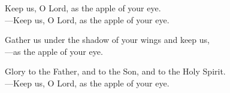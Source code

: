 \responsory

\noindent Keep us, O Lord, as the apple of your eye.\\
{\color{red}---\thinspace}Keep us, O Lord, as the apple of your eye.

\medskip\noindent Gather us under the shadow of your wings and keep us,\\
{\color{red}---\thinspace}as the apple of your eye.

\medskip\noindent Glory to the Father, and to the Son, and to the Holy Spirit.\\
{\color{red}---\thinspace}Keep us, O Lord, as the apple of your eye.